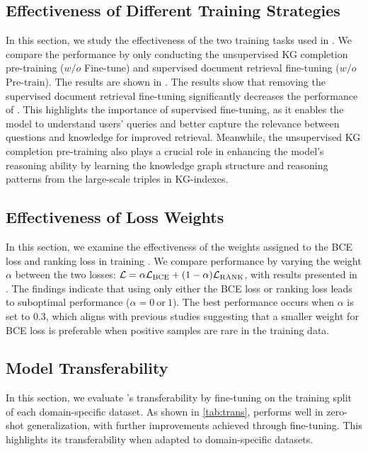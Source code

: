 
\subsection{Effectiveness of Different Training Strategies}\label{app:pre-training}
In this section, we study the effectiveness of the two training tasks used in \ourmethod. We compare the performance by only conducting the unsupervised KG completion pre-training (\ourmethod $w/o$ Fine-tune) and supervised document retrieval fine-tuning (\ourmethod $w/o$ Pre-train). The results are shown in . The results show that removing the supervised document retrieval fine-tuning significantly decreases the performance of \ourmethod. This highlights the importance of supervised fine-tuning, as it enables the model to understand users' queries and better capture the relevance between questions and knowledge for improved retrieval. Meanwhile, the unsupervised KG completion pre-training also plays a crucial role in enhancing the model's reasoning ability by learning the knowledge graph structure and reasoning patterns from the large-scale triples in KG-indexes.


\subsection{Effectiveness of Loss Weights}\label{app:loss_weight}
In this section, we examine the effectiveness of the weights assigned to the BCE loss and ranking loss in training \ourmethod. We compare performance by varying the weight $\alpha$ between the two losses: ${\mathcal{L}}=\alpha{\mathcal{L}}_{\text{BCE}} + (1-\alpha){\mathcal{L}}_{\text{RANK}}$, with results presented in . The findings indicate that using only either the BCE loss or ranking loss leads to suboptimal performance ($\alpha=0~\text{or}~1$). The best performance occurs when $\alpha$ is set to 0.3, which aligns with previous studies \cite{lin2024understanding} suggesting that a smaller weight for BCE loss is preferable when positive samples are rare in the training data.

\subsection{Model Transferability}\label{app:trans}

In this section, we evaluate \ourmethod's transferability by fine-tuning on the training split of each domain-specific dataset. As shown in \ref{tab:trans}, \ourmethod performs well in zero-shot generalization, with further improvements achieved through fine-tuning. This highlights its transferability when adapted to domain-specific datasets.

